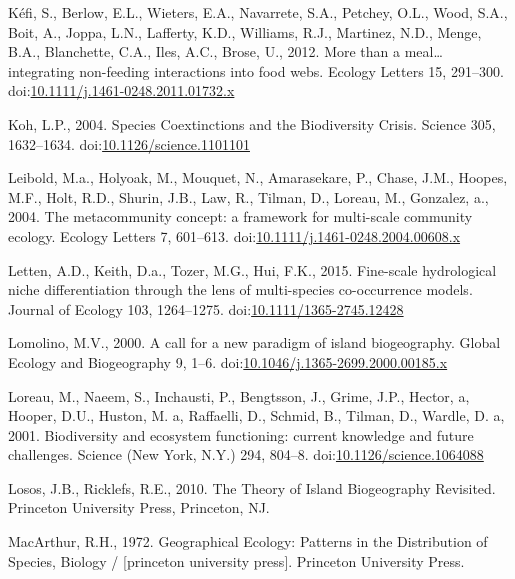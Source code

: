\hypertarget{ref-Kefi2012}{}
Kéfi, S., Berlow, E.L., Wieters, E.A., Navarrete, S.A., Petchey, O.L.,
Wood, S.A., Boit, A., Joppa, L.N., Lafferty, K.D., Williams, R.J.,
Martinez, N.D., Menge, B.A., Blanchette, C.A., Iles, A.C., Brose, U.,
2012. More than a meal\ldots{} integrating non-feeding interactions into
food webs. Ecology Letters 15, 291--300.
doi:\href{https://doi.org/10.1111/j.1461-0248.2011.01732.x}{10.1111/j.1461-0248.2011.01732.x}

\hypertarget{ref-Koh2004}{}
Koh, L.P., 2004. Species Coextinctions and the Biodiversity Crisis.
Science 305, 1632--1634.
doi:\href{https://doi.org/10.1126/science.1101101}{10.1126/science.1101101}

\hypertarget{ref-Leibold2004}{}
Leibold, M.a., Holyoak, M., Mouquet, N., Amarasekare, P., Chase, J.M.,
Hoopes, M.F., Holt, R.D., Shurin, J.B., Law, R., Tilman, D., Loreau, M.,
Gonzalez, a., 2004. The metacommunity concept: a framework for
multi-scale community ecology. Ecology Letters 7, 601--613.
doi:\href{https://doi.org/10.1111/j.1461-0248.2004.00608.x}{10.1111/j.1461-0248.2004.00608.x}

\hypertarget{ref-Letten2015}{}
Letten, A.D., Keith, D.a., Tozer, M.G., Hui, F.K., 2015. Fine-scale
hydrological niche differentiation through the lens of multi-species
co-occurrence models. Journal of Ecology 103, 1264--1275.
doi:\href{https://doi.org/10.1111/1365-2745.12428}{10.1111/1365-2745.12428}

\hypertarget{ref-Lomolino2000}{}
Lomolino, M.V., 2000. A call for a new paradigm of island biogeography.
Global Ecology and Biogeography 9, 1--6.
doi:\href{https://doi.org/10.1046/j.1365-2699.2000.00185.x}{10.1046/j.1365-2699.2000.00185.x}

\hypertarget{ref-Loreau2001}{}
Loreau, M., Naeem, S., Inchausti, P., Bengtsson, J., Grime, J.P.,
Hector, a, Hooper, D.U., Huston, M. a, Raffaelli, D., Schmid, B.,
Tilman, D., Wardle, D. a, 2001. Biodiversity and ecosystem functioning:
current knowledge and future challenges. Science (New York, N.Y.) 294,
804--8.
doi:\href{https://doi.org/10.1126/science.1064088}{10.1126/science.1064088}

\hypertarget{ref-Losos2010}{}
Losos, J.B., Ricklefs, R.E., 2010. The Theory of Island Biogeography
Revisited. Princeton University Press, Princeton, NJ.

\hypertarget{ref-macarthur1972geographical}{}
MacArthur, R.H., 1972. Geographical Ecology: Patterns in the
Distribution of Species, Biology / {[}princeton university press{]}.
Princeton University Press.

